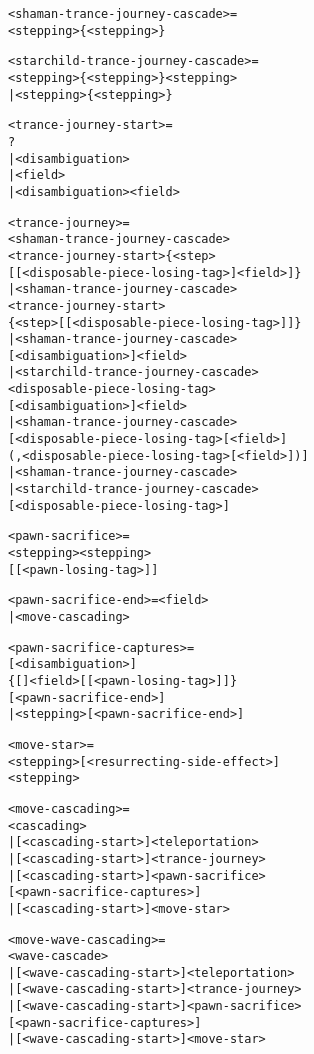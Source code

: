 \begin{alltt}
<shaman-trance-journey-cascade> =
  <stepping>\{<stepping>\}

<starchild-trance-journey-cascade> =
  <stepping>\{<stepping>\}<stepping>
| <stepping>\{<stepping>\}

<trance-journey-start> =
  ?
| <disambiguation>
| \alg{,}<field>
| <disambiguation>\alg{,}<field>

<trance-journey> =
  <shaman-trance-journey-cascade>
    <trance-journey-start>\{<step>
    [\alg{<}[<disposable-piece-losing-tag>]<field>]\}
| <shaman-trance-journey-cascade>
    <trance-journey-start>
    \{<step>[\alg{*}[<disposable-piece-losing-tag>]]\}
| <shaman-trance-journey-cascade>
    [<disambiguation>]<field>
| <starchild-trance-journey-cascade>
    <disposable-piece-losing-tag>
    [<disambiguation>]<field>
| <shaman-trance-journey-cascade>
    [<disposable-piece-losing-tag>[<field>]
    (,<disposable-piece-losing-tag>[<field>])]
| <shaman-trance-journey-cascade>
| <starchild-trance-journey-cascade>
    [<disposable-piece-losing-tag>]
\end{alltt}

\clearpage %

\begin{alltt}
<pawn-sacrifice> =
  <stepping><stepping>
    [\alg{*}[<pawn-losing-tag>]]\alg{;;}

<pawn-sacrifice-end> = \alg{|}<field>
                     | <move-cascading>

<pawn-sacrifice-captures> =
  [<disambiguation>]
    \{[]<field>[\alg{*}[<pawn-losing-tag>]]\}
    [<pawn-sacrifice-end>]
| <stepping>[<pawn-sacrifice-end>]

<move-star> =
  <stepping>[<resurrecting-side-effect>]
    \alg{~}<stepping>

<move-cascading> =
  <cascading>
| [<cascading-start>]<teleportation>
| [<cascading-start>]<trance-journey>
| [<cascading-start>]<pawn-sacrifice>
    [<pawn-sacrifice-captures>]
| [<cascading-start>]<move-star>

<move-wave-cascading> =
  <wave-cascade>
| [<wave-cascading-start>]<teleportation>
| [<wave-cascading-start>]<trance-journey>
| [<wave-cascading-start>]<pawn-sacrifice>
    [<pawn-sacrifice-captures>]
| [<wave-cascading-start>]<move-star>
\end{alltt}

